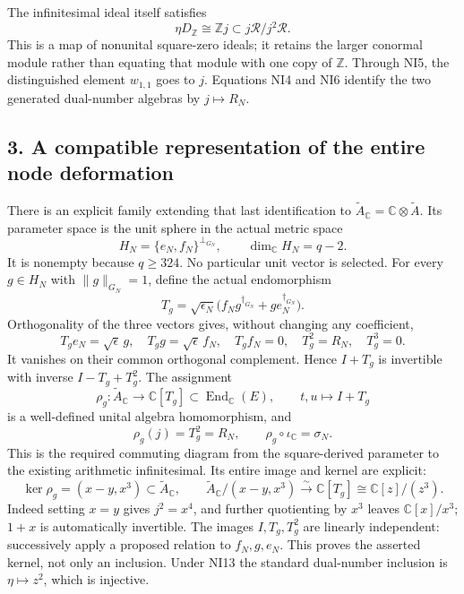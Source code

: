 \documentclass[
]{article}
\begin{document}
The infinitesimal ideal itself satisfies \[
\eta D_{\mathbb Z}\cong\mathbb Zj\subset j\mathcal R/j^2\mathcal R.
\tag{NI7}
\] This is a map of nonunital square-zero ideals; it retains the larger
conormal module rather than equating that module with one copy of
\(\mathbb Z\). Through NI5, the distinguished element \(w_{1,1}\) goes
to \(j\). Equations NI4 and NI6 identify the two generated dual-number
algebras by \(j\mapsto R_N\).

\subsection{3. A compatible representation of the entire node
deformation}\label{a-compatible-representation-of-the-entire-node-deformation}

There is an explicit family extending that last identification to
\(\widetilde A_{\mathbb C}=\mathbb C\otimes\widetilde A\). Its parameter
space is the unit sphere in the actual metric space \[
H_N=\{e_N,f_N\}^{\perp_{G_N}},\qquad \dim_{\mathbb C}H_N=q-2.
\tag{NI8}
\] It is nonempty because \(q\ge324\). No particular unit vector is
selected. For every \(g\in H_N\) with \(\|g\|_{G_N}=1\), define the
actual endomorphism \[
T_g=\sqrt{\epsilon_N}\bigl(f_Ng^{\dagger_{G_N}}+g e_N^{\dagger_{G_N}}\bigr).
\tag{NI9}
\] Orthogonality of the three vectors gives, without changing any
coefficient, \[
T_ge_N=\sqrt\epsilon\,g,\quad T_gg=\sqrt\epsilon\,f_N,\quad T_gf_N=0,
\quad T_g^2=R_N,\quad T_g^3=0.
\tag{NI10}
\] It vanishes on their common orthogonal complement. Hence \(I+T_g\) is
invertible with inverse \(I-T_g+T_g^2\). The assignment \[
\rho_g:\widetilde A_{\mathbb C}\longrightarrow\mathbb C[T_g]
\subset\operatorname{End}_{\mathbb C}(E),
\qquad t,u\longmapsto I+T_g
\tag{NI11}
\] is a well-defined unital algebra homomorphism, and \[
\rho_g(j)=T_g^2=R_N,\qquad
\rho_g\circ\iota_{\mathbb C}=\sigma_N.
\tag{NI12}
\] This is the required commuting diagram from the square-derived
parameter to the existing arithmetic infinitesimal. Its entire image and
kernel are explicit: \[
\ker\rho_g=(x-y,x^3)\subset\widetilde A_{\mathbb C},
\qquad
\widetilde A_{\mathbb C}/(x-y,x^3)
\xrightarrow{\sim}\mathbb C[T_g]\cong\mathbb C[z]/(z^3).
\tag{NI13}
\] Indeed setting \(x=y\) gives \(j^2=x^4\), and further quotienting by
\(x^3\) leaves \(\mathbb C[x]/x^3\); \(1+x\) is automatically
invertible. The images \(I,T_g,T_g^2\) are linearly independent:
successively apply a proposed relation to \(f_N,g,e_N\). This proves the
asserted kernel, not only an inclusion. Under NI13 the standard
dual-number inclusion is \(\eta\mapsto z^2\), which is injective.
\end{document}
